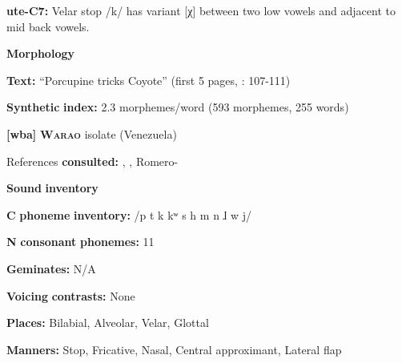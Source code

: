 \begin{styleBody}
\textbf{ute-C7:} Velar stop /k/ has variant [χ] between two low vowels and adjacent to mid back vowels.
\end{styleBody}

\begin{styleBody}
\textbf{Morphology}
\end{styleBody}

\begin{styleBody}
\textbf{Text:} “Porcupine tricks Coyote” (first 5 pages, \citealt{Givón2013}: 107-111)
\end{styleBody}

\begin{styleBody}
\textbf{Synthetic} \textbf{index:} 2.3 morphemes/word (593 morphemes, 255 words)
\end{styleBody}

\begin{styleBody}
\textbf{[wba]} \textbf{\textsc{Warao}}  isolate (Venezuela)
\end{styleBody}

\begin{styleBody}
References \textbf{consulted:} \citet{Arinterol2000}, \citet{Osborn1966}, Romero-\citet{Figeroa1997}
\end{styleBody}

\begin{styleBody}
\textbf{Sound} \textbf{inventory}
\end{styleBody}

\begin{styleBody}
\textbf{C} \textbf{phoneme} \textbf{inventory:} /p t k kʷ s h m n ɺ w j/
\end{styleBody}

\begin{styleBody}
\textbf{N} \textbf{consonant} \textbf{phonemes:} 11
\end{styleBody}

\begin{styleBody}
\textbf{Geminates:} N/A
\end{styleBody}

\begin{styleBody}
\textbf{Voicing} \textbf{contrasts:} None
\end{styleBody}

\begin{styleBody}
\textbf{Places:} Bilabial, Alveolar, Velar, Glottal
\end{styleBody}

\begin{styleBody}
\textbf{Manners:} Stop, Fricative, Nasal, Central approximant, Lateral flap
\end{styleBody}

